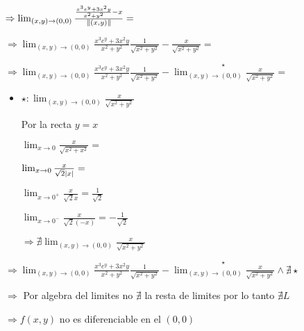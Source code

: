 \documentclass[../parcial.tex]{subfiles}
\begin{document}
    $\Rightarrow \lim_{(x,y)\to (0,0)} \frac{ \frac{x^3e^y+3x^2y}{x^2+y^2} - x}{\norm*{(x,y)}} = $

    $\Rightarrow \lim_{(x,y)\to (0,0)} \frac{x^3e^y+3x^2y}{x^2+y^2}\frac{1}{\sqrt{x^2+y^2}} - \frac{x}{\sqrt{x^2+y^2}} = $

    $\Rightarrow \lim_{(x,y)\to (0,0)} \frac{x^3e^y+3x^2y}{x^2+y^2}\frac{1}{\sqrt{x^2+y^2}} - \stackrel{\star}{\lim_{(x,y)\to (0,0)} \frac{x}{\sqrt{x^2+y^2}}} = $

        \begin{itemize}
            \item $\star: \lim_{(x,y)\to (0,0)} \frac{x}{\sqrt{x^2+y^2}} $
            
                Por la recta $y = x$

                $\lim_{x \to 0} \frac{x}{\sqrt{x^2+x^2}} = $

                $\lim_{x \to 0} \frac{x}{\sqrt{2} \abs*{x}} = $

                $\lim_{x \to 0^+} \frac{x}{\sqrt{2} x} = \frac{1}{\sqrt{2}} $

                $\lim_{x \to 0^-} \frac{x}{\sqrt{2}(-x)} = -\frac{1}{\sqrt{2}} $

                $\Rightarrow \nexists \lim_{(x,y)\to (0,0)} \frac{x}{\sqrt{x^2+y^2}}$

        \end{itemize}

    $\Rightarrow \lim_{(x,y)\to (0,0)} \frac{x^3e^y+3x^2y}{x^2+y^2}\frac{1}{\sqrt{x^2+y^2}} - \stackrel{\star}{\lim_{(x,y)\to (0,0)} \frac{x}{\sqrt{x^2+y^2}}} \wedge \nexists \star $

    $\Rightarrow $ Por algebra del limites no $\nexists$ la resta de limites por lo tanto $\nexists L$

    $\Rightarrow f(x,y)$ no es diferenciable en el $(0,0)$
\end{document}
